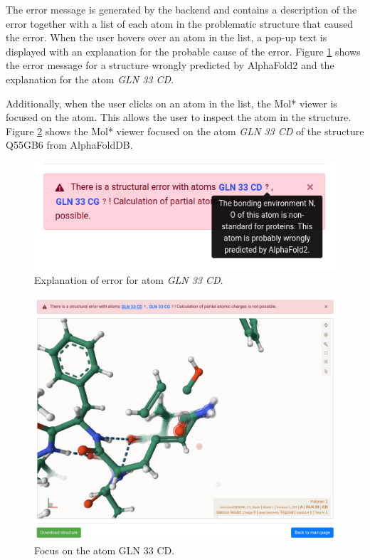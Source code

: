 \documentclass[
  digital,     %
  oneside,     %
  nosansbold,  %
  nocolorbold, %
  lof,         %
  lot,         %
]{fithesis4}
\begin{document}
The error message is generated by the backend and contains a description of the error together with a list of each atom in the problematic structure that caused the error. When the user hovers over an atom in the list, a pop-up text is displayed with an explanation for the probable cause of the error. Figure \ref{fig:wrong_structure_text} shows the error message for a structure wrongly predicted by AlphaFold2 and the explanation for the atom \textit{GLN 33 CD}.

Additionally, when the user clicks on an atom in the list, the Mol* viewer is focused on the atom. This allows the user to inspect the atom in the structure. Figure \ref{fig:wrong_structure_focus} shows the Mol* viewer focused on the atom \textit{GLN 33 CD} of the structure Q55GB6 from AlphaFoldDB.

\begin{figure}[htbp]
  \begin{center}
    \includegraphics[width=\textwidth]{figures/wrong_structure_text.png}
  \end{center}
  \caption{Explanation of error for atom \textit{GLN 33 CD}.}
  \label{fig:wrong_structure_text}
\end{figure}

\begin{figure}[htbp]
  \begin{center}
    \includegraphics[width=\textwidth]{figures/wrong_structure_focus.png}
  \end{center}
  \caption{Focus on the atom GLN 33 CD.}
  \label{fig:wrong_structure_focus}
\end{figure}
\end{document}
